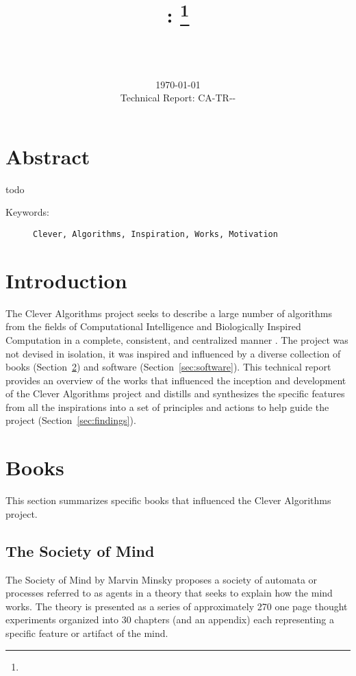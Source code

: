 \documentclass[a4paper, 11pt]{article}
\title{{\myreporttitle}: {\myreportsubtitle}\footnote{\myreportlicense}}
\author{\myreportauthor\\{\myreportemail}\\\small\myreportproject}
\date{\today\\{\small{Technical Report: CA-TR-{\myreportdate}-\myreportversion}}}
\begin{document}
\maketitle

\section*{Abstract} 
todo

\begin{description}
	\item[Keywords:] {\small\texttt{Clever, Algorithms, Inspiration, Works, Motivation}}
\end{description} 

\section{Introduction}
\label{sec:introduction}
The Clever Algorithms project seeks to describe a large number of algorithms from the fields of Computational Intelligence and Biologically Inspired Computation in a complete, consistent, and centralized manner \cite{Brownlee2010}. The project was not devised in isolation, it was inspired and influenced by a diverse collection of books (Section~\ref{sec:books}) and software (Section~\ref{sec:software}). This technical report provides an overview of the works that influenced the inception and development of the Clever Algorithms project and distills and synthesizes the specific features from all the inspirations into a set of principles and actions to help guide the project (Section~\ref{sec:findings}).

\section{Books}
\label{sec:books}
This section summarizes specific books that influenced the Clever Algorithms project.

% 
% 
\subsection{The Society of Mind}
The Society of Mind by Marvin Minsky \cite{Minsky1988} proposes a society of automata or processes referred to as agents in a theory that seeks to explain how the mind works. The theory is presented as a series of approximately 270 one page thought experiments organized into 30 chapters (and an appendix) each representing a specific feature or artifact of the mind. 
\end{document}
